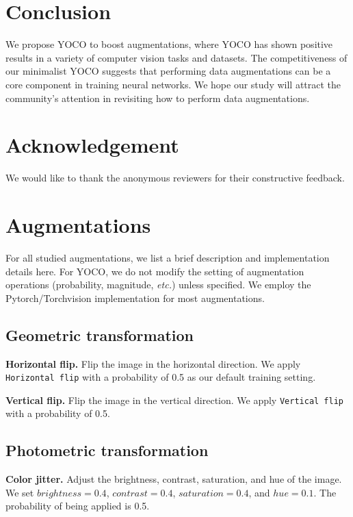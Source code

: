 \documentclass{article}
\newcommand\etc{\emph{etc.}}
\begin{document}
\section{Conclusion}
We propose YOCO to boost augmentations, where YOCO has shown positive results in a variety of computer vision tasks and datasets. The competitiveness of our minimalist YOCO suggests that performing data augmentations can be a core component in training neural networks. We hope our study will attract the community’s attention in revisiting how to perform data augmentations. 

\section*{Acknowledgement}
We would like to thank the anonymous reviewers for their constructive feedback. 





\newpage
\appendix
\onecolumn
\section{Augmentations}
\label{sec:appendix}
For all studied augmentations, we list a brief description and implementation details here. For YOCO, we do not modify the setting of augmentation operations (probability, magnitude, \etc{}) unless specified. We employ the Pytorch/Torchvision implementation for most augmentations. 

\subsection{Geometric transformation}
\textbf{Horizontal flip.} Flip the image in the horizontal direction. We apply \texttt{Horizontal flip} with a probability of 0.5 as our default training setting.

\textbf{Vertical flip.} Flip the image in the vertical direction. We apply \texttt{Vertical flip} with a probability of 0.5.

\subsection{Photometric transformation}

\textbf{Color jitter.} 
Adjust the brightness, contrast, saturation, and hue of the image. We set $brightness = 0.4$, $contrast = 0.4$, $saturation = 0.4$, and $hue = 0.1$. The probability of being applied is 0.5. 
\end{document}
